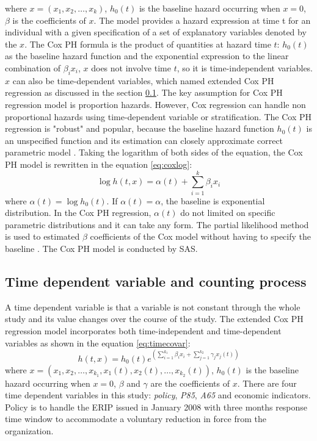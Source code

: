 \documentclass[12pt,letterpaper]{article}
\begin{document}
   where $x=(x_1, x_2, \ldots, x_k)$, $h_0(t)$ is the baseline hazard occurring when $x=0$, $\beta$ is the coefficients of $x$.
   The model provides a hazard expression at time t for an individual with a given specification of a set of explanatory variables denoted by the $x$. The Cox PH formula is the product of quantities at hazard time $t$: $h_0 (t)$ as the baseline hazard function and the exponential expression to the linear combination of $\beta_i x_i$, $x$ does not involve time $t$, so it is time-independent variables. $x$ can also be time-dependent variables, which named extended Cox PH regression as discussed in the section \ref{sec:coxt}. The key assumption for Cox PH regression model is proportion hazards. However, Cox regression can handle non proportional hazards using time-dependent variable or stratification.
   The Cox PH regression is "robust" and popular, because the baseline hazard function $h_0 (t)$ is an unspecified function and its estimation can closely approximate correct parametric model \citep{kleinbaum1998}. Taking the logarithm of both sides of the equation, the Cox PH model is rewritten in the equation \ref{eq:coxlog}:
   \begin{equation}
   \label{eq:coxlog}
   \log{h(t,x)}=\alpha(t)+\sum_{i=1}^{k}\beta_ix_i
   \end{equation}
   where $\alpha(t)=\log{h_0(t)}$. If $\alpha(t)=\alpha$, the baseline is exponential distribution. In the Cox PH regression, $\alpha(t)$ do not limited on specific parametric distributions and it can take any form. The partial likelihood method is used to estimated $\beta$ coefficients of the Cox model without having to specify the baseline \citep{allison1995}. The Cox PH model is conducted by SAS.


\subsection{Time dependent variable and counting process}
\label{sec:coxt}
A time dependent variable is that a variable is not constant through the whole study and its value changes over the course of the study. The extended Cox PH regression model incorporates both time-independent and time-dependent variables as shown in the equation \ref{eq:timecovar}:
\begin{equation}
\label{eq:timecovar}
h(t,x)=h_0(t)e^{(\sum_{i=1}^{k_1}\beta_ix_i+\sum_{j=1}^{k_2}\gamma_jx_j(t))}
\end{equation}
where $x=(x_1, x_2, \ldots, x_{k_1}, x_1(t), x_2(t), \ldots, x_{k_2}(t))$, $h_0(t)$ is the baseline hazard occurring when $x=0$, $\beta$ and $\gamma$ are the coefficients of $x$.
There are four time dependent variables in this study: {\it policy}, {\it P85}, {\it A65} and economic indicators. Policy is to handle the ERIP issued in January 2008 with three months response time window to accommodate a voluntary reduction in force from the organization.
\end{document}

